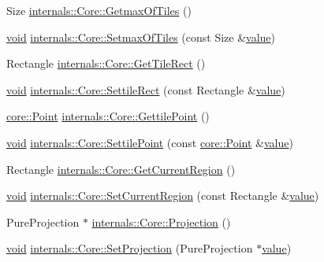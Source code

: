 \begin{DoxyCompactItemize}
\item 
Size \hyperlink{group___o_p_map_widget_gaa2cd678b4016f6334bfef3c1c8ac3b03}{internals\-::\-Core\-::\-Getmax\-Of\-Tiles} ()
\item 
\hyperlink{group___u_a_v_objects_plugin_ga444cf2ff3f0ecbe028adce838d373f5c}{void} \hyperlink{group___o_p_map_widget_gab059331f4276245f3415728687b72659}{internals\-::\-Core\-::\-Setmax\-Of\-Tiles} (const Size \&\hyperlink{glext_8h_aa0e2e9cea7f208d28acda0480144beb0}{value})
\item 
Rectangle \hyperlink{group___o_p_map_widget_gaff36128b86944502f81b27d0d9ca418b}{internals\-::\-Core\-::\-Get\-Tile\-Rect} ()
\item 
\hyperlink{group___u_a_v_objects_plugin_ga444cf2ff3f0ecbe028adce838d373f5c}{void} \hyperlink{group___o_p_map_widget_ga6305b3465177838582206b9911561cf9}{internals\-::\-Core\-::\-Settile\-Rect} (const Rectangle \&\hyperlink{glext_8h_aa0e2e9cea7f208d28acda0480144beb0}{value})
\item 
\hyperlink{structcore_1_1_point}{core\-::\-Point} \hyperlink{group___o_p_map_widget_ga917de66816feaf3dfde7727bbb8ed6e2}{internals\-::\-Core\-::\-Gettile\-Point} ()
\item 
\hyperlink{group___u_a_v_objects_plugin_ga444cf2ff3f0ecbe028adce838d373f5c}{void} \hyperlink{group___o_p_map_widget_ga9d04a0fb020c49a8280b7368f41594a2}{internals\-::\-Core\-::\-Settile\-Point} (const \hyperlink{structcore_1_1_point}{core\-::\-Point} \&\hyperlink{glext_8h_aa0e2e9cea7f208d28acda0480144beb0}{value})
\item 
Rectangle \hyperlink{group___o_p_map_widget_ga00bfe5203c4a1a950f4699bf6fe59293}{internals\-::\-Core\-::\-Get\-Current\-Region} ()
\item 
\hyperlink{group___u_a_v_objects_plugin_ga444cf2ff3f0ecbe028adce838d373f5c}{void} \hyperlink{group___o_p_map_widget_gaddaa2d4fdadeb35b3d6e5c36414ad438}{internals\-::\-Core\-::\-Set\-Current\-Region} (const Rectangle \&\hyperlink{glext_8h_aa0e2e9cea7f208d28acda0480144beb0}{value})
\item 
Pure\-Projection $\ast$ \hyperlink{group___o_p_map_widget_ga9c5fee7624bff404ca2529858e9a444a}{internals\-::\-Core\-::\-Projection} ()
\item 
\hyperlink{group___u_a_v_objects_plugin_ga444cf2ff3f0ecbe028adce838d373f5c}{void} \hyperlink{group___o_p_map_widget_gae73f665340d21d819b8309c1d39d44bb}{internals\-::\-Core\-::\-Set\-Projection} (Pure\-Projection $\ast$\hyperlink{glext_8h_aa0e2e9cea7f208d28acda0480144beb0}{value})
\item 

\end{DoxyCompactItemize}
